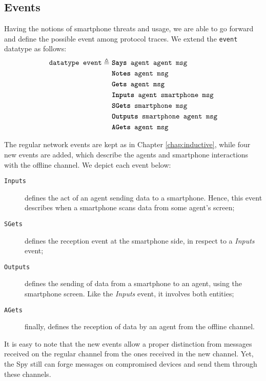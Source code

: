 \subsection{Events}
Having the notions of smartphone threats and usage, we are able to go forward and define the possible event among protocol traces. We extend the \texttt{event} datatype as follows:
%
\begin{equation*}
  \begin{split}
    \texttt{datatype event} \triangleq \
    & \texttt{\textbf{Says} agent agent msg} \\
    & \texttt{\textbf{Notes} agent msg} \\
    & \texttt{\textbf{Gets} agent msg} \\
    & \texttt{\textbf{Inputs} agent smartphone msg} \\
    & \texttt{\textbf{SGets} smartphone msg} \\
    & \texttt{\textbf{Outputs} smartphone agent msg} \\
    & \texttt{\textbf{AGets} agent msg}
  \end{split}
\end{equation*}

The regular network events are kept as in Chapter \ref{chap:inductive}, while four new events are added, which describe the agents and smartphone interactions with the offline channel. We depict each event below:

\begin{description}
  \item[\texttt{Inputs}] defines the act of an agent sending data to a smartphone. Hence, this event describes when a smartphone scans data from some agent's screen;

  \item[\texttt{SGets}] defines the reception event at the smartphone side, in respect to a \textit{Inputs} event;

  \item[\texttt{Outputs}] defines the sending of data from a smartphone to an agent, using the smartphone screen. Like the \textit{Inputs} event, it involves both entities;

  \item[\texttt{AGets}] finally, defines the reception of data by an agent from the offline channel.
\end{description}

It is easy to note that the new events allow a proper distinction from messages received on the regular channel from the ones received in the new channel. Yet, the Spy still can forge messages on compromised devices and send them through these channels.

